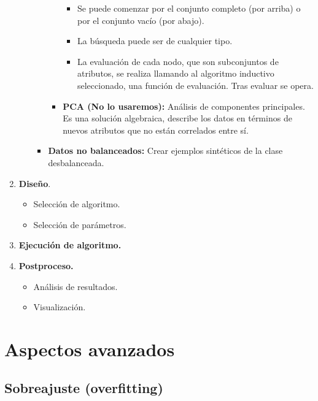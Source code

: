 \documentclass[12pt, twoside, openright]{report} %
\begin{document}
\begin{enumerate}
\begin{itemize}
\begin{itemize}
\begin{itemize}
\begin{itemize}
        \item
          Se puede comenzar por el conjunto completo (por arriba) o por
          el conjunto vacío (por abajo).
        \item
          La búsqueda puede ser de cualquier tipo.
        \item
          La evaluación de cada nodo, que son subconjuntos de atributos,
          se realiza llamando al algoritmo inductivo seleccionado, una
          función de evaluación. Tras evaluar se opera.
        \end{itemize}
      \item
        \textbf{PCA (No lo usaremos):} Análisis de componentes
        principales. Es una solución algebraica, describe los datos en
        términos de nuevos atributos que no están correlados entre sí.
      \end{itemize}
    \item
      \textbf{Datos no balanceados:} Crear ejemplos sintéticos de la
      clase desbalanceada.
    \end{itemize}
  \end{itemize}
\item
  \textbf{Diseño}.

  \begin{itemize}
  
  \item
    Selección de algoritmo.
  \item
    Selección de parámetros.
  \end{itemize}
\item
  \textbf{Ejecución de algoritmo.}
\item
  \textbf{Postproceso.}

  \begin{itemize}
  
  \item
    Análisis de resultados.
  \item
    Visualización.
  \end{itemize}
\end{enumerate}

\section{Aspectos avanzados}

\subsection{Sobreajuste
(overfitting)}
\end{document}
